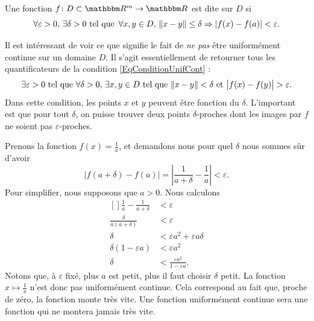 \begin{definition}
	Une fonction $f\colon D\subset\eR^m\to \eR$ est dite  sur $D$ si
	\begin{equation}	\label{EqConditionUnifCont}
		\forall\varepsilon>0,\,\exists\delta>0\text{ tel que }\,\forall x,y\in D,\,\| x-y \|\leq\delta \Rightarrow| f(x)-f(a) |<\varepsilon.
	\end{equation}
\end{definition}

Il est intéressant de voir ce que signifie le fait de \emph{ne pas} être uniformément continue sur un domaine $D$. Il s'agit essentiellement de retourner tous les quantificateurs de la condition \eqref{EqConditionUnifCont} :
\begin{equation}	\label{EqConditionPasUnifCont}
	\exists\varepsilon>0\tq\forall\delta>0,\,\exists x,y\in D\tq \| x-y \|<\delta\text{ et }\big| f(x)-f(y) \big|>\varepsilon.
\end{equation}
Dans cette condition, les points $x$ et $y$ peuvent être fonction du $\delta$. L'important est que pour tout $\delta$, on puisse trouver deux points $\delta$-proches dont les images par $f$ ne soient pas $\varepsilon$-proches.

\begin{example}
	Prenons la fonction $f(x)=\frac{1}{ x }$, et demandons nous pour quel $\delta$ nous sommes sûr d'avoir
	\begin{equation}
		| f(a+\delta)-f(a) |=\left| \frac{1}{ a+\delta }-\frac{1}{ a } \right| <\varepsilon.
	\end{equation}
	Pour simplifier, nous supposons que $a>0$. Nous calculons
	\begin{equation}
		\begin{aligned}[]
			\frac{ 1 }{ a }-\frac{1}{ a+\delta }&<	\varepsilon\\
			\frac{ \delta }{ a(a+\delta) }&<\varepsilon\\
			\delta&<\varepsilon a^2+\varepsilon a\delta\\
			\delta(1-\varepsilon a)&<\varepsilon a^2\\
			\delta&<\frac{ \varepsilon a^2 }{ 1-\varepsilon a }.
		\end{aligned}
	\end{equation}
	Notons que, à $\varepsilon$ fixé, plus $a$ est petit, plus il faut choisir $\delta$ petit. La fonction $x\mapsto\frac{1}{ x }$ n'est donc pas uniformément continue. Cela correspond au fait que, proche de zéro, la fonction monte très vite. Une fonction uniformément continue sera une fonction qui ne montera jamais très vite.
\end{example}

